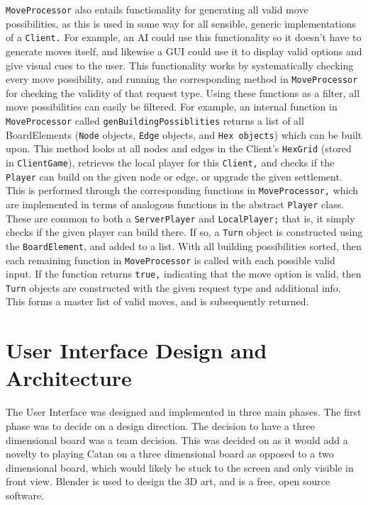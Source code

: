 \documentclass[a4paper,doc]{apa6}
\newcommand{\code}{\texttt}
\begin{document}
\code{MoveProcessor} also entails functionality for generating all valid move possibilities, as this is used in some way for all sensible, generic implementations of a \code{Client.} For example, an AI could use this functionality so it doesn’t have to generate moves itself, and likewise a GUI could use it to display valid options and give visual cues to the user. This functionality works by systematically checking every move possibility, and running the corresponding method in \code{MoveProcessor} for checking the  validity of that request type. Using these functions as a filter, all move possibilities can easily be filtered. For example, an internal function in \code{MoveProcessor} called \code{genBuildingPossiblities} returns a list of all BoardElements (\code{Node} objects, \code{Edge} objects, and \code{Hex objects}) which can be built upon. This method looks at all nodes and edges in the Client’s \code{HexGrid} (stored in \code{ClientGame}), retrieves the local player for this \code{Client,} and checks if the \code{Player} can build on the given node or edge, or upgrade the given settlement. This is performed through the corresponding functions in \code{MoveProcessor,} which are implemented in terms of analogous functions in the abstract \code{Player} class. These are common to both a \code{ServerPlayer} and \code{LocalPlayer;} that is, it simply checks if the given player can build there. If so, a \code{Turn} object is constructed using the \code{BoardElement}, and added to a list. With all building possibilities sorted, then each remaining function in \code{MoveProcessor} is called with each possible valid input. If the function returns \code{true,} indicating that the move option is valid, then \code{Turn} objects are constructed with the given request type and additional info. This forms a master list of valid moves, and is subsequently returned.

\section{User Interface Design and Architecture}


The User Interface was designed and implemented in three main phases. The first phase was to decide on a design direction. The decision to have a three dimensional board was a team decision. This was decided on as it would add a novelty to playing Catan on a three dimensional board as opposed to a two dimensional board, which would likely be stuck to the screen and only visible in front view. Blender is used to design the 3D art, and is a free, open source software.
\end{document}
